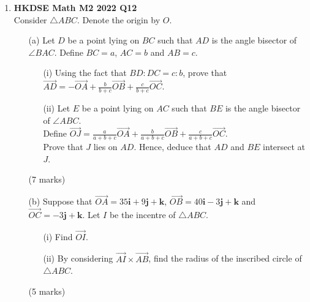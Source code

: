 \documentclass[12pt]{article}
\begin{document}
\begin{enumerate}
	\item \textbf{HKDSE Math M2 2022 Q12}\\
	Consider $\triangle ABC$. Denote the origin by $O$. 
	\begin{enumerate}
		\item [(a)]Let $D$ be a point lying on $BC$ such that $AD$ is the angle bisector of $\angle BAC$. Define $BC = a$, $AC = b$  and  $AB = c$. 
		\begin{enumerate}
			\item [(i)]Using the fact that $BD:DC = c:b$, prove that $\overrightarrow{AD} = -\overrightarrow{OA}+\displaystyle\frac{b}{b+c}\overrightarrow{OB} + \displaystyle\frac{c}{b+c}\overrightarrow{OC}$. 
			\item [(ii)]Let $E$ be a point lying on $AC$ such that $BE$ is the angle bisector of $\angle ABC$. \\
				Define $\overrightarrow{OJ} = \displaystyle\frac{a}{a+b+c}\overrightarrow{OA}+\displaystyle\frac{b}{a+b+c}\overrightarrow{OB}+\displaystyle\frac{c}{a+b+c}\overrightarrow{OC}$. \\
				Prove that $J$ lies on $AD$. Hence, deduce that $AD$ and $BE$ intersect at $J$.
		\end{enumerate}
		(7 marks)
		\item [(b)]Suppose that $\overrightarrow{OA} = 35\textbf{i} +9 \textbf{j}+ \textbf {k}$, $\overrightarrow{OB} = 40\textbf{i} -3 \textbf{j}+ \textbf {k}$ and $\overrightarrow{OC} =  -3 \textbf{j}+ \textbf {k}$. Let $I$ be the incentre of $\triangle ABC$. 
		\begin{enumerate}
			\item [(i)] Find $\overrightarrow{OI}$. 
			\item [(ii)] By considering $\overrightarrow{AI} \times \overrightarrow{AB}$, find the radius of the inscribed circle of $\triangle ABC$. 
		\end{enumerate}
		(5 marks)
	\end{enumerate}
\end{enumerate}
\end{document}
